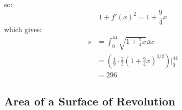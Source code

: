 \begin{itemize}
\begin{example}
\begin{equation}
        \end{equation}
        so:
        \begin{equation}
            1+f'(x)^2 = 1 + \frac{9}{4}x
        \end{equation}
        which gives:
        \begin{align}
            s &= \int_0^{44} \sqrt{1+\frac{9}{4}x}\dd{x} \\ 
            &= \left(\frac{4}{9}\cdot \frac{2}{3}\left(1+\frac{9}{4}x\right)^{3/2}\right)\Biggr|^{44}_{0} \\ 
            &= 296
        \end{align}
    \end{example}
\end{itemize}
\subsection{Area of a Surface of Revolution}
